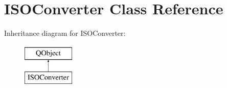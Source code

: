 \hypertarget{class_i_s_o_converter}{}\section{I\+S\+O\+Converter Class Reference}
\label{class_i_s_o_converter}
Inheritance diagram for I\+S\+O\+Converter\+:\begin{figure}[H]
\begin{center}
\leavevmode
\includegraphics[height=2.000000cm]{class_i_s_o_converter}
\end{center}
\end{figure}
